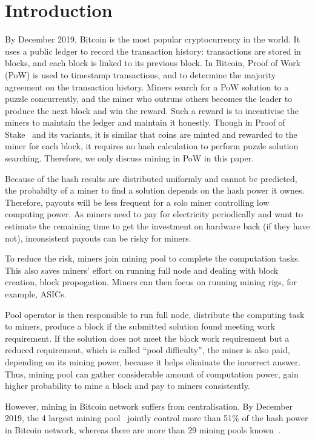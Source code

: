 \section{Introduction}

By December 2019, Bitcoin is the most popular cryptocurrency in the world.
It uses a public ledger to record the transaction history: transactions are stored in blocks, and each block is linked to its previous block.
In Bitcoin, Proof of Work (PoW) is used to timestamp transactions, and to determine the majority agreement on the transaction history.
Miners search for a PoW solution to a puzzle concurrently, and the miner who outruns others becomes the leader to produce the next block and win the reward.
Such a reward is to incentivise the miners to maintain the ledger and maintain it honestly.
Though in Proof of Stake~\cite{} and its variants, it is similar that coins are minted and rewarded to the miner for each block, it requires no hash calculation to perform puzzle solution searching.
Therefore, we only discuss mining in PoW in this paper.

Because of the hash results are distributed uniformly and cannot be predicted, the probabilty of a miner to find a solution depends on the hash power it ownes.
Therefore, payouts will be less frequent for a solo miner controlling low computing power.
As miners need to pay for electricity periodically and want to estimate the remaining time to get the investment on hardware back (if they have not), inconsistent payouts can be risky for miners.

To reduce the risk, miners join mining pool to complete the computation tasks.
This also saves miners' effort on running full node and dealing with block creation, block propogation. 
Miners can then focus on running mining rigs, for example, ASICs.

Pool operator is then responsible to run full node, distribute the computing task to miners, 
produce a block if the submitted solution found meeting work requirement.
If the solution does not meet the block work requirement but a reduced requirement, which is called ``pool difficulty'', the miner is also paid, depending on its mining power, because it helps eliminate the incorrect answer.
Thus, mining pool can gather considerable amount of computation power, gain higher probability to mine a block and pay to miners consistently.

However, mining in Bitcoin network suffers from centralisation.
By December 2019, the 4 largest mining pool~\cite{}  jointly control more than 51\% of the hash power in Bitcoin network, whereas there are more than 29 mining pools known~\cite{}.

